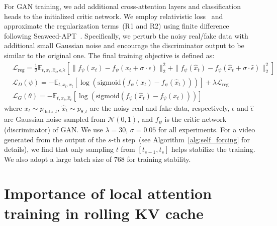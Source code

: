 For GAN training, we add additional cross-attention layers and classification heads to the initialized critic network. We employ relativistic loss~\cite{jolicoeurrelativistic} and approximate the regularization terms~(R1 and R2) using finite difference following Seaweed-APT~\cite{lin2025diffusion}. Specifically, we perturb the noisy real/fake data with additional small Gaussian noise and encourage the discriminator output to be similar to the original one. The final training objective is defined as:
\begin{align}
    & \mathcal{L}_{\text{reg}} = \frac{1}{2} \mathbb{E}_{t, x_t, \hat{x}_t, \epsilon, \hat{\epsilon}} \left[ \| f_\psi(x_t) - f_\psi(x_t+\sigma \cdot \epsilon ) \|_2^2 + \| f_\psi(\hat{x}_t) - f_\psi(\hat{x}_t + \sigma \cdot \hat{\epsilon} ) \|_2^2 \right] \\
    & \mathcal{L}_{D}(\psi) = -\mathbb{E}_{t, x_t, \hat{x}_t} \left[ \log \left( \text{sigmoid} \left(f_\psi(x_t) - f_\psi(\hat{x}_t) \right)\right) \right] + \lambda\mathcal{L}_{\text{reg}} \\
    & \mathcal{L}_{G}(\theta) = -\mathbb{E}_{t, x_t, \hat{x}_t} \left[ \log \left( \text{sigmoid} \left(f_\psi(\hat{x}_t) - f_\psi(x_t) \right)\right) \right]
\end{align}
where $x_t\sim p_{\text{data}, t}$, $\hat{x}_t\sim p_{\theta, t}$ are the noisy real and fake data, respectively, $\epsilon$ and $\hat{\epsilon}$ are Gaussian noise sampled from $\mathcal{N}(0, 1)$, and $f_\psi$ is the critic network (discriminator) of GAN. We use $\lambda=30$, $\sigma=0.05$ for all experiments.  For a video generated from the output of the $s$-th step~(see Algorithm~\ref{alg:self_forcing} for details), we find that only sampling $t$ from $[t_{s-1}, t_{s}]$ helps stabilize the training. We also adopt a large batch size of 768 for training stability.


\section{Importance of local attention training in rolling KV cache}
\label{app:qualitative}





